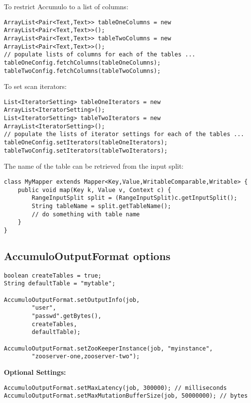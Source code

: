 To restrict Accumulo to a list of columns:

\small
\begin{verbatim}
ArrayList<Pair<Text,Text>> tableOneColumns = new ArrayList<Pair<Text,Text>>();
ArrayList<Pair<Text,Text>> tableTwoColumns = new ArrayList<Pair<Text,Text>>();
// populate lists of columns for each of the tables ...
tableOneConfig.fetchColumns(tableOneColumns);
tableTwoConfig.fetchColumns(tableTwoColumns);
\end{verbatim}
\normalsize

To set scan iterators:

\small
\begin{verbatim}
List<IteratorSetting> tableOneIterators = new ArrayList<IteratorSetting>();
List<IteratorSetting> tableTwoIterators = new ArrayList<IteratorSetting>();
// populate the lists of iterator settings for each of the tables ...
tableOneConfig.setIterators(tableOneIterators);
tableTwoConfig.setIterators(tableTwoIterators);
\end{verbatim}
\normalsize


The name of the table can be retrieved from the input split:

\small
\begin{verbatim}
class MyMapper extends Mapper<Key,Value,WritableComparable,Writable> {
    public void map(Key k, Value v, Context c) {
        RangeInputSplit split = (RangeInputSplit)c.getInputSplit();
        String tableName = split.getTableName();
        // do something with table name 
    }
}
\end{verbatim}
\normalsize


\subsection{AccumuloOutputFormat options}

\small
\begin{verbatim}
boolean createTables = true;
String defaultTable = "mytable";

AccumuloOutputFormat.setOutputInfo(job,
        "user",
        "passwd".getBytes(),
        createTables,
        defaultTable);

AccumuloOutputFormat.setZooKeeperInstance(job, "myinstance",
        "zooserver-one,zooserver-two");
\end{verbatim}

\Large
\textbf{Optional Settings:}
\normalsize

\small
\begin{verbatim}
AccumuloOutputFormat.setMaxLatency(job, 300000); // milliseconds
AccumuloOutputFormat.setMaxMutationBufferSize(job, 50000000); // bytes
\end{verbatim}
\normalsize

